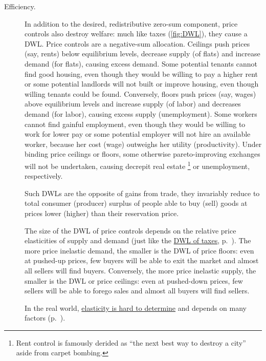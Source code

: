 \begin{description}
	\item[Efficiency.]
	In addition to the desired, redistributive zero-sum component, price controls also destroy welfare:
	much like taxes (\autoref{fig:DWL}), they cause a \gls{DWL}.
	Price controls are a negative-sum allocation.
	Ceilings push prices (say, rents) below equilibrium levels, decrease supply (of flats) and increase demand (for flats), causing excess demand.
	Some potential tenants cannot find good housing, even though they would be willing to pay a higher rent or some potential landlords will not built or improve housing, even though willing tenants could be found.
	Conversely, floors push prices (say, wages) above equilibrium levels and increase supply (of labor) and decreases demand (for labor), causing excess supply (unemployment).
	Some workers cannot find gainful employment, even though they would be willing to work for lower pay or some potential employer will not hire an available worker, because her cost (wage) outweighs her utility (productivity).
	Under binding price ceilings or floors, some otherwise pareto-improving exchanges will not be undertaken, causing decrepit real estate
	\footnote{
		Rent control is famously derided as ``the next best way to destroy a city'' aside from carpet bombing.
	}
	or unemployment, respectively.

	Such \glspl{DWL} are the opposite of gains from trade, they invariably reduce to total consumer (producer) surplus of people able to buy (sell) goods at prices lower (higher) than their reservation price.

	The size of the \gls{DWL} of price controls depends on the relative price elasticities of supply and demand (just like the \hyperref[sec:minimal-DWL]{\gls{DWL} of taxes}, p.~\pageref{sec:minimal-DWL}).
	The more price inelastic demand, the smaller is the \gls{DWL} of price floors:
	even at pushed-up prices, few buyers will be able to exit the market and almost all sellers will find buyers.
	Conversely, the more price inelastic supply, the smaller is the \gls{DWL} or price ceilings:
	even at pushed-down prices, few sellers will be able to forego sales and almost all buyers will find sellers.

	In the real world, \hyperref[sec:well-determined-incidence]{elasticity is hard to determine} and depends on many factors (p.~\pageref{sec:well-determined-incidence}).


\end{description}
